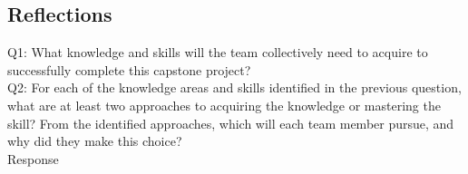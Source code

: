 \documentclass[12pt, titlepage]{article}
\begin{document}
\subsection{Reflections}

\noindent Q1: What knowledge and skills will the team collectively need to acquire to successfully complete this capstone project? \\
\noindent Q2: For each of the knowledge areas and skills identified in the previous question, what are at least two approaches to acquiring the knowledge or mastering the skill? 
From the identified approaches, which will each team member pursue, and why did they make this choice?\\

\noindent Response
\end{document}
